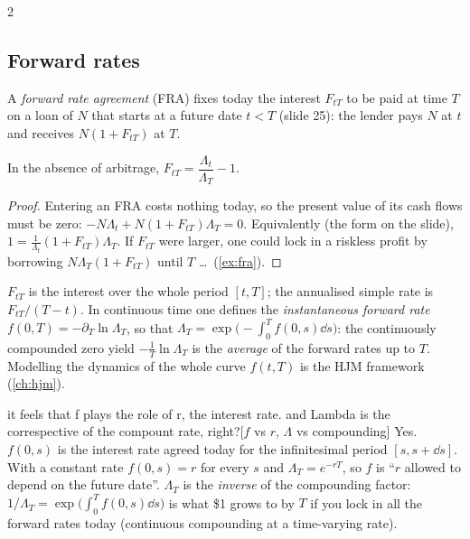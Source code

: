 \begin{paracol}{2}
\subsection{Forward rates}\label{sec:forward}
\begin{definition}
A \emph{forward rate agreement} (FRA) fixes today the interest $F_{tT}$ to be paid at time $T$ on a
loan of $N$ that starts at a future date $t<T$ (slide 25): the lender pays $N$ at $t$ and receives
$N(1+F_{tT})$ at $T$.
\end{definition}

\begin{proposition}\label{prop:forward}
In the absence of arbitrage, $F_{tT} = \dfrac{\Lambda_t}{\Lambda_T} - 1$.
\end{proposition}
\begin{proof}
Entering an FRA costs nothing today, so the present value of its cash flows must be zero:
$-N\Lambda_t + N(1+F_{tT})\Lambda_T = 0$. Equivalently (the form on the slide),
$1 = \frac{1}{\Lambda_t}(1+F_{tT})\Lambda_T$. If $F_{tT}$ were larger, one could lock in a riskless
profit by borrowing $N\Lambda_T(1+F_{tT})$ until $T$ \dots\ (\cref{ex:fra}).
\end{proof}

\begin{remark}
$F_{tT}$ is the interest over the whole period $[t,T]$; the annualised simple rate is
$F_{tT}/(T-t)$. In continuous time one defines the \emph{instantaneous forward rate}
$f(0,T) = -\partial_T \ln \Lambda_T$, so that $\Lambda_T = \exp\bigl(-\int_0^T f(0,s)\dd s\bigr)$: the
continuously compounded zero yield $-\frac1T\ln\Lambda_T$ is the \emph{average} of the forward rates
up to $T$. Modelling the dynamics of the whole curve $f(t,T)$ is the HJM framework (\cref{ch:hjm}).
\end{remark}\begin{answer}{it feels that f plays the role of r, the interest rate. and Lambda is the correspective of the compount rate, right?}[$f$ vs $r$, $\Lambda$ vs compounding]
Yes. $f(0,s)$ is the interest rate agreed today for the infinitesimal period $[s,s+\dd s]$. With a constant
rate $f(0,s)=r$ for every $s$ and $\Lambda_T=e^{-rT}$, so $f$ is ``$r$ allowed to depend on the future date''.
$\Lambda_T$ is the \emph{inverse} of the compounding factor: $1/\Lambda_T=\exp\bigl(\int_0^T f(0,s)\dd s\bigr)$ is
what \$1 grows to by $T$ if you lock in all the forward rates today (continuous compounding at a
time-varying rate).
\end{answer}



\end{paracol}
